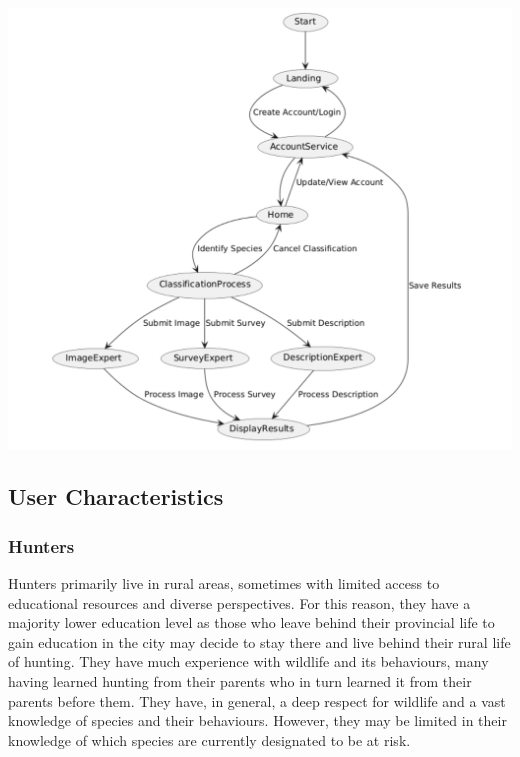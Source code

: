 \documentclass[]{article}
\begin{document}
\includegraphics[scale=0.50]{2.2StateDiagram.png}

\subsection{User Characteristics}
\label{sub:user_characteristics}
\subsubsection{Hunters}
Hunters primarily live in rural areas, sometimes with limited access to educational resources and diverse perspectives. For this reason, they have a majority lower education level 
as those who leave behind their provincial life to gain education in the city may decide to stay there and live behind their rural life of hunting. They have much experience with
 wildlife and its behaviours, many having learned hunting from their parents who in turn learned it from their parents before them. They have, in general,
 a deep respect for wildlife and a vast knowledge of species and their behaviours. However, they may be limited in their knowledge of which species are 
 currently designated to be at risk.
\end{document}
